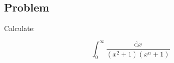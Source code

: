 \documentclass{article}
\begin{document}
\subsection{Problem}
Calculate:

$$
\int_0^\infty \frac{\mathrm{d}x}{(x^2 + 1)(x^\alpha + 1)}
$$



%
%
%
\end{document}
